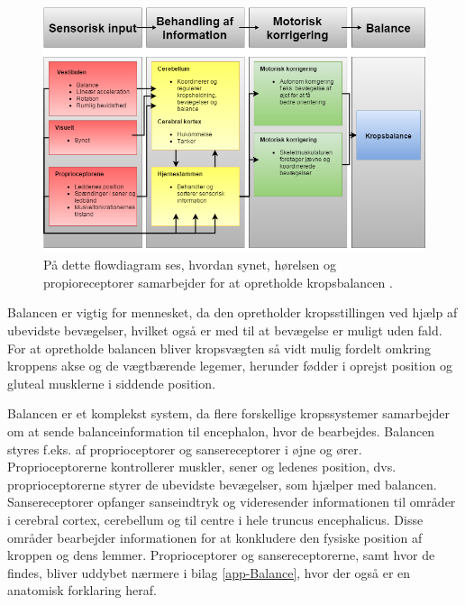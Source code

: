 \begin{figure}[H]
	\centering
	\includegraphics[scale=0.48]{figures/bProblemanalyse/Balance-Flowdiagram.png}
	\caption{På dette flowdiagram ses, hvordan synet, hørelsen og propioreceptorer samarbejder for at opretholde kropsbalancen \cite{watson2015}.}
	\label{flowbalance}
\end{figure}



Balancen er vigtig for mennesket, da den opretholder kropsstillingen ved hjælp af ubevidste bevægelser, hvilket også er med til at bevægelse er muligt uden fald. For at opretholde balancen bliver kropsvægten så vidt mulig fordelt omkring kroppens akse og de vægtbærende legemer, herunder fødder i oprejst position og gluteal musklerne i siddende position.\cite{Nichols1997}

Balancen er et komplekst system, da flere forskellige kropssystemer samarbejder om at sende balanceinformation til encephalon, hvor de bearbejdes. Balancen styres f.eks. af proprioceptorer og sansereceptorer i øjne og ører. Proprioceptorerne kontrollerer muskler, sener og ledenes position, dvs. proprioceptorerne styrer de ubevidste bevægelser, som hjælper med balancen. \cite{Martini2012} Sansereceptorer opfanger sanseindtryk og videresender informationen til områder i cerebral cortex, cerebellum og til centre i hele truncus encephalicus. Disse områder bearbejder informationen for at konkludere den fysiske position af kroppen og dens lemmer. \cite{Martini2012,Karnath2003} Proprioceptorer og sansereceptorerne, samt hvor de findes, bliver uddybet nærmere i bilag \ref{app-Balance}, hvor der også er en anatomisk forklaring heraf.

